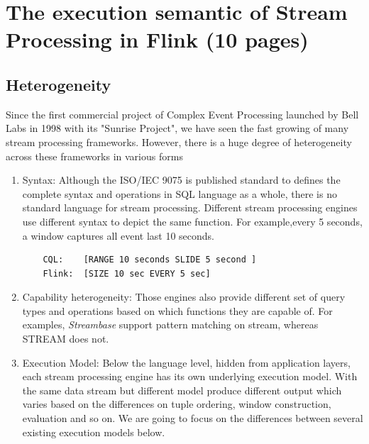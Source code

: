 
\chapter{The execution semantic of Stream Processing in Flink (10 pages)}

\ifpdf
    \graphicspath{{Chapter3/Figs/Raster/}{Chapter3/Figs/PDF/}{Chapter3/Figs/}}
\else
    \graphicspath{{Chapter3/Figs/Vector/}{Chapter3/Figs/}}
\fi

\section{Heterogeneity}\label{Heterogeneity}
Since the first commercial project of Complex Event Processing launched by Bell Labs in 1998 with its "Sunrise Project", we have seen the fast growing of many stream processing frameworks. However, there is a huge degree of heterogeneity across these frameworks in various forms\citep{Dindar:2013}

\begin{enumerate}

	\item Syntax: Although the ISO/IEC 9075 is published standard to defines the complete syntax and operations in SQL language as a whole, there is no standard language for stream processing. Different stream processing engines use different syntax to depict the same function. For example,every 5 seconds, a window captures all event last 10 seconds. 
	\begin{verbatim}
	CQL: 	[RANGE 10 seconds SLIDE 5 second ] 
	Flink: 	[SIZE 10 sec EVERY 5 sec]
	\end{verbatim}
	
	\item Capability heterogeneity:
	Those engines also provide different set of query types and operations based on which functions they are capable of. For examples, \textit{Streambase} support pattern matching on stream, whereas STREAM does not.
	
	\item Execution Model: Below the language level, hidden from application layers, each stream processing engine has its own underlying execution model. With the same data stream but different model produce different output which varies based on the differences on tuple ordering,  window construction, evaluation and so on. We are going to focus on the differences between several existing execution models below.
	
	
\end{enumerate}
 
